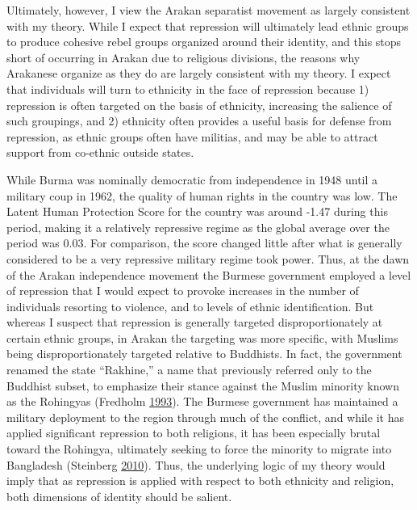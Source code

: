 \documentclass[12pt,]{book}
\theoremstyle{definition}
\theoremstyle{definition}
\theoremstyle{remark}
\begin{document}
Ultimately, however, I view the Arakan separatist movement as largely
consistent with my theory. While I expect that repression will
ultimately lead ethnic groups to produce cohesive rebel groups organized
around their identity, and this stops short of occurring in Arakan due
to religious divisions, the reasons why Arakanese organize as they do
are largely consistent with my theory. I expect that individuals will
turn to ethnicity in the face of repression because 1) repression is
often targeted on the basis of ethnicity, increasing the salience of
such groupings, and 2) ethnicity often provides a useful basis for
defense from repression, as ethnic groups often have militias, and may
be able to attract support from co-ethnic outside states.

While Burma was nominally democratic from independence in 1948 until a
military coup in 1962, the quality of human rights in the country was
low. The Latent Human Protection Score for the country was around -1.47
during this period, making it a relatively repressive regime as the
global average over the period was 0.03. For comparison, the score
changed little after what is generally considered to be a very
repressive military regime took power. Thus, at the dawn of the Arakan
independence movement the Burmese government employed a level of
repression that I would expect to provoke increases in the number of
individuals resorting to violence, and to levels of ethnic
identification. But whereas I suspect that repression is generally
targeted disproportionately at certain ethnic groups, in Arakan the
targeting was more specific, with Muslims being disproportionately
targeted relative to Buddhists. In fact, the government renamed the
state ``Rakhine,'' a name that previously referred only to the Buddhist
subset, to emphasize their stance against the Muslim minority known as
the Rohingyas (Fredholm \protect\hyperlink{ref-Fredholm1993}{1993}). The
Burmese government has maintained a military deployment to the region
through much of the conflict, and while it has applied significant
repression to both religions, it has been especially brutal toward the
Rohingya, ultimately seeking to force the minority to migrate into
Bangladesh (Steinberg \protect\hyperlink{ref-Steinberg2010}{2010}).
Thus, the underlying logic of my theory would imply that as repression
is applied with respect to both ethnicity and religion, both dimensions
of identity should be salient.
\end{document}
